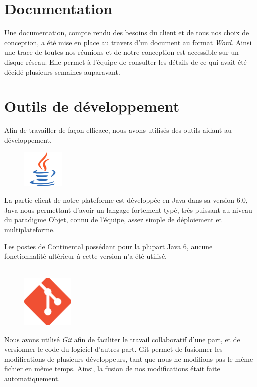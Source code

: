 \section{Documentation}
Une documentation, compte rendu des besoins du client et de tous nos choix de conception, a été mise en place au travers d’un document au format \textit{Word}. Ainsi une
trace de toutes nos réunions et de notre conception est accessible sur un disque réseau. Elle permet à l'équipe de consulter les détails de ce qui avait été décidé plusieurs semaines auparavant.

\section{Outils de développement}
Afin de travailler de façon efficace, nous avons utilisés des outils aidant au développement.

\begin{figure}
	\includegraphics[width=2cm]{contents/images/logoJava.png}
\end{figure}
La partie client de notre plateforme est développée en Java dans sa version 6.0, Java nous permettant d'avoir un langage fortement typé, très puissant au niveau du paradigme Objet, connu de l'équipe, assez simple de déploiement et multiplateforme. 

Les postes de Continental possédant pour la plupart Java 6, aucune fonctionnalité ultérieur à cette version n'a été utilisé.\\~

\begin{figure}
	\includegraphics[width=2.5cm]{contents/images/logoGit.png}
\end{figure}
Nous avons utilisé \textit{Git} afin de faciliter le travail collaboratif d'une part, et de versionner le code du logiciel d'autres part. Git permet de fusionner les
modifications de plusieurs développeurs, tant que nous ne modifions pas le même fichier en même temps. Ainsi, la fusion de nos modifications était faite automatiquement. 

